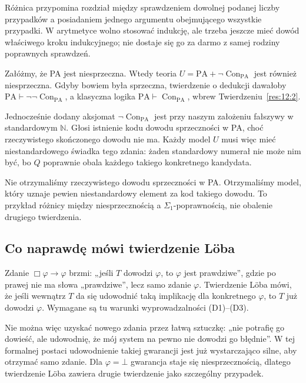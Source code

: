 Różnica przypomina rozdział między sprawdzeniem dowolnej podanej liczby przypadków a posiadaniem jednego argumentu obejmującego wszystkie przypadki. W arytmetyce wolno stosować indukcję, ale trzeba jeszcze mieć dowód właściwego kroku indukcyjnego; nie dostaje się go za darmo z samej rodziny poprawnych sprawdzeń.

\begin{przyklad}\label{res:17:1}
Załóżmy, że PA jest niesprzeczna. Wtedy teoria $U=\mathrm{PA}+\neg\operatorname{Con}_{\mathrm{PA}}$ jest również niesprzeczna. Gdyby bowiem była sprzeczna, twierdzenie o dedukcji dawałoby $\mathrm{PA}\vdash\neg\neg\operatorname{Con}_{\mathrm{PA}}$, a klasyczna logika $\mathrm{PA}\vdash\operatorname{Con}_{\mathrm{PA}}$, wbrew Twierdzeniu~\ref{res:12:2}.

Jednocześnie dodany aksjomat $\neg\operatorname{Con}_{\mathrm{PA}}$ jest przy naszym założeniu fałszywy w standardowym $\mathbb N$. Głosi istnienie kodu dowodu sprzeczności w PA, choć rzeczywistego skończonego dowodu nie ma. Każdy model $U$ musi więc mieć niestandardowego świadka tego zdania: żaden standardowy numerał nie może nim być, bo $Q$ poprawnie obala każdego takiego konkretnego kandydata.

Nie otrzymaliśmy rzeczywistego dowodu sprzeczności w PA. Otrzymaliśmy model, który uznaje pewien niestandardowy element za kod takiego dowodu. To przykład różnicy między niesprzecznością a $\Sigma_1$-poprawnością, nie obalenie drugiego twierdzenia.
\end{przyklad}

\subsection*{Co naprawdę mówi twierdzenie Löba}\label{sec:17:3}
Zdanie $\Box\varphi\to\varphi$ brzmi: „jeśli $T$ dowodzi $\varphi$, to $\varphi$ jest prawdziwe”, gdzie po prawej nie ma słowa „prawdziwe”, lecz samo zdanie $\varphi$. Twierdzenie Löba mówi, że jeśli wewnątrz $T$ da się udowodnić taką implikację dla konkretnego $\varphi$, to $T$ już dowodzi $\varphi$. Wymagane są tu warunki wyprowadzalności (D1)--(D3).

Nie można więc uzyskać nowego zdania przez łatwą sztuczkę: „nie potrafię go dowieść, ale udowodnię, że mój system na pewno nie dowodzi go błędnie”. W tej formalnej postaci udowodnienie takiej gwarancji jest już wystarczająco silne, aby otrzymać samo zdanie. Dla $\varphi=\bot$ gwarancja staje się niesprzecznością, dlatego twierdzenie Löba zawiera drugie twierdzenie jako szczególny przypadek.

